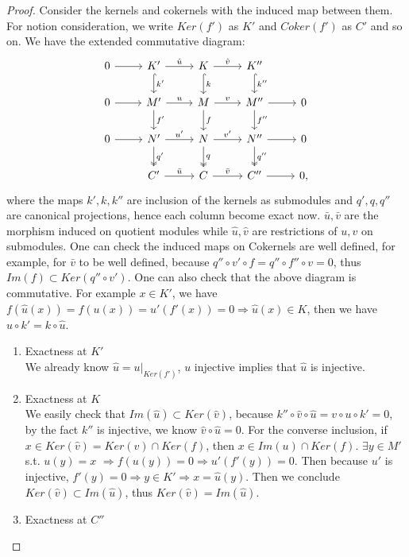 \documentclass[11pt]{article}
\newcommand{\Lrta}{\Longrightarrow}
\begin{document}
\begin{proof}
Consider the kernels and cokernels with the induced map between them. For notion consideration, we write $Ker(f')$ as $K'$ and $Coker(f')$ as $C'$ and so on. We have the extended commutative diagram:
\[
\begin{tikzcd}
0\arrow[r]  
& K'  \arrow[r,"\hat{u}"]\arrow[d,"k'",hook] 
& K\arrow[r,"\hat{v}"] \arrow[d,"k",hook] \arrow[ddd,phantom,""{coordinate, name=Z}] 
& K'' \arrow[d,"k''",hook]  
& \\
0\arrow[r]  & M'  \arrow[r,"u"]\arrow[d,"f'"] & M\arrow[r,"v"] \arrow[d,"f"] & M''\arrow[r] \arrow[d,"f''"] & 0 \\
0\arrow[r]  & N'  \arrow[r,"u'"] \arrow[d,"q'",two heads]& N\arrow[r,"v'"] \arrow[d,"q",two heads]& N''\arrow[r]\arrow[d,"q''",two heads]  & 0 \\
  & C'  \arrow[r,"\bar{u}"] & C\arrow[r,"\bar{v}"] & C''\arrow[r]  & 0,
\end{tikzcd}
\]
where the maps $k',k,k''$ are inclusion of the kernels as submodules and $q',q,q''$ are canonical projections, hence each column become exact now. $\bar{u}, \bar{v}$ are the morphism induced on quotient modules while $\hat{u}, \hat{v}$ are restrictions of $u,v$ on submodules. One can check the induced maps on Cokernels are well defined, for example, for $\bar{v}$ to be well defined, because $q''\circ v'\circ f=q''\circ f''\circ v =0$, thus $Im(f)\subset Ker(q''\circ v')$. One can also check that the above diagram is commutative. For example $x\in K'$, we have $f(\hat{u}(x))=f(u(x))=u'(f'(x))=0\Lrta \hat{u}(x)\in K$, then we have $u\circ k'=k\circ \hat{u}$. 
\begin{enumerate}
\item Exactness at $K'$\\
We already know $\hat{u}=u|_{Ker(f')}$, $u$ injective implies that $\hat{u}$ is injective.
\item Exactness at $K$\\
We easily check that $Im(\hat{u})\subset Ker(\hat{v})$, because $k''\circ \hat{v}\circ \hat{u}=v\circ u\circ k'=0$, by the fact $k''$ is injective, we know $\hat{v}\circ\hat{u}=0$. For the converse inclusion, if $x\in Ker(\hat{v})=Ker(v)\cap Ker(f)$, then $x\in Im(u)\cap Ker(f)$. $\exists y\in M'$ s.t. $u(y)=x$ $\Lrta f(u(y))=0 \Lrta u'(f'(y))=0 $. Then because $u'$ is injective, $f'(y)=0\Lrta y\in K'\Lrta x=\hat{u}(y)$. Then we conclude $Ker(\hat{v})\subset Im(\hat{u})$, thus $Ker(\hat{v})= Im(\hat{u})$.
\item Exactness at $C''$\\

\end{enumerate}
\end{proof}
\end{document}

